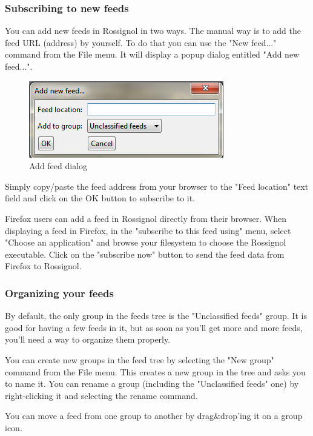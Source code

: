 \documentclass[11pt]{article} %
\begin{document}
\subsubsection{Subscribing to new feeds}

You can add new feeds in Rossignol in two ways. The manual way is to add the 
feed URL (address) by yourself. To do that you can use the "New feed..." 
command from the File menu. It will display a popup dialog entitled 
"Add new feed...".

\begin{figure}[h]
\centering
\includegraphics{img/add_feed_dialog.png}
\caption{Add feed dialog}
\end{figure}

Simply copy/paste the feed address from your browser to the "Feed location" 
text field and click on the OK button to subscribe to it.

Firefox users can add a feed in Rossignol directly from their browser. 
When displaying a feed in Firefox, in the "subscribe to this feed using" menu, 
select "Choose an application" and browse your filesystem to choose the 
Rossignol executable. Click on the "subscribe now" button to send the feed data 
from Firefox to Rossignol. 

\subsubsection{Organizing your feeds}

By default, the only group in the feeds tree is the "Unclassified feeds" group. 
It is good for having a few feeds in it, but as soon as you'll get more and more
feeds, you'll need a way to organize them properly.

You can create new groups in the feed tree by selecting the "New group" command 
from the File menu. This creates a new group in the tree and asks you to name 
it. You can rename a group (including the "Unclassified feeds" one) by 
right-clicking it and selecting the rename command. 

You can move a feed from one group to another by drag\&drop'ing it on a group 
icon. 
\end{document}
